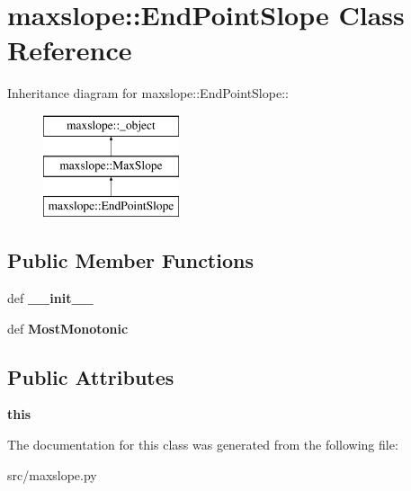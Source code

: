 \hypertarget{classmaxslope_1_1EndPointSlope}{
\section{maxslope::EndPointSlope Class Reference}
\label{d5/d36/classmaxslope_1_1EndPointSlope}
}
Inheritance diagram for maxslope::EndPointSlope::\begin{figure}[H]
\begin{center}
\leavevmode
\includegraphics[height=3cm]{d5/d36/classmaxslope_1_1EndPointSlope}
\end{center}
\end{figure}
\subsection*{Public Member Functions}
\begin{DoxyCompactItemize}
\item 
\hypertarget{classmaxslope_1_1EndPointSlope_aa64ffcafb99bb6f9978a9037f14a18db}{
def {\bfseries \_\-\_\-init\_\-\_\-}}
\label{d5/d36/classmaxslope_1_1EndPointSlope_aa64ffcafb99bb6f9978a9037f14a18db}

\item 
\hypertarget{classmaxslope_1_1EndPointSlope_ac9ac444eccb64b1489ddf729975cb201}{
def {\bfseries MostMonotonic}}
\label{d5/d36/classmaxslope_1_1EndPointSlope_ac9ac444eccb64b1489ddf729975cb201}

\end{DoxyCompactItemize}
\subsection*{Public Attributes}
\begin{DoxyCompactItemize}
\item 
\hypertarget{classmaxslope_1_1EndPointSlope_ac09aca88eb1acd43cdfe6292862a3de1}{
{\bfseries this}}
\label{d5/d36/classmaxslope_1_1EndPointSlope_ac09aca88eb1acd43cdfe6292862a3de1}

\end{DoxyCompactItemize}


The documentation for this class was generated from the following file:\begin{DoxyCompactItemize}
\item 
src/maxslope.py\end{DoxyCompactItemize}
